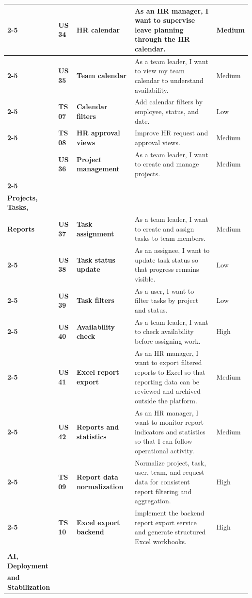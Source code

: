 \begin{longtable}{|>{\centering\bfseries}m{2.55cm}|>{\centering\bfseries}m{0.9cm}|>{\centering\bfseries}m{3.05cm}|m{6.75cm}|>{\centering\arraybackslash}m{1.45cm}|}
\cline{2-5}
& US 34 & HR calendar & As an HR manager, I want to supervise leave planning through the HR calendar. & Medium \\
\cline{2-5}
& US 35 & Team calendar & As a team leader, I want to view my team calendar to understand availability. & Medium \\
\cline{2-5}
& TS 07 & Calendar filters & Add calendar filters by employee, status, and date. & Low \\
\cline{2-5}
& TS 08 & HR approval views & Improve HR request and approval views. & Medium \\
\hline

& US 36 & Project management & As a team leader, I want to create and manage projects. & Medium \\
\cline{2-5}
\multicolumn{1}{|>{\centering\bfseries}m{2.55cm}|}{\centering\textbf{Sprint 5\\[4pt] Projects, Tasks,\\Reports}}
& US 37 & Task assignment & As a team leader, I want to create and assign tasks to team members. & Medium \\
\cline{2-5}
& US 38 & Task status update & As an assignee, I want to update task status so that progress remains visible. & Low \\
\cline{2-5}
& US 39 & Task filters & As a user, I want to filter tasks by project and status. & Low \\
\cline{2-5}
& US 40 & Availability check & As a team leader, I want to check availability before assigning work. & High \\
\cline{2-5}
& US 41 & Excel report export & As an HR manager, I want to export filtered reports to Excel so that reporting data can be reviewed and archived outside the platform. & Medium \\
\cline{2-5}
& US 42 & Reports and statistics & As an HR manager, I want to monitor report indicators and statistics so that I can follow operational activity. & Medium \\
\cline{2-5}
& TS 09 & Report data normalization & Normalize project, task, user, team, and request data for consistent report filtering and aggregation. & High \\
\cline{2-5}
& TS 10 & Excel export backend & Implement the backend report export service and generate structured Excel workbooks. & High \\
\hline
\multirow{11}{=}{\centering\textbf{Sprint 6\\[4pt] AI, Deployment\\and Stabilization}}

\end{longtable}

